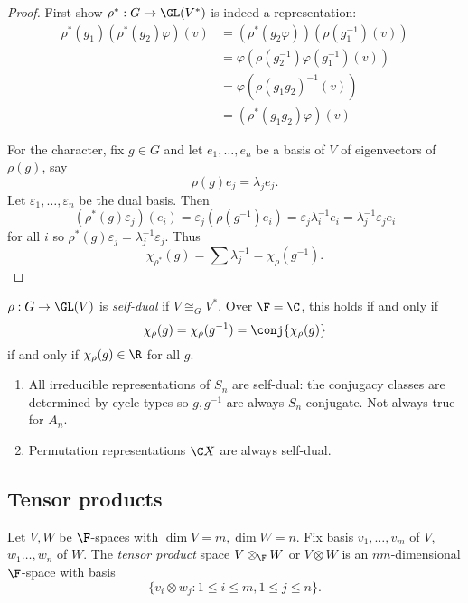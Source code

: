 \documentclass[a4paper]{article}
\theoremstyle{definition}
\begin{document}
\begin{proof}
  First show \(\rho^*: G \to \GL(V^*)\) is indeed a representation:
  \begin{align*}
    \rho^*(g_1) (\rho^*(g_2) \varphi)(v)
    &= (\rho^*(g_2\varphi)) (\rho(g_1^{-1}) (v)) \\
    &= \varphi(\rho(g_2^{-1}) \varphi(g_1^{-1})(v)) \\
    &= \varphi(\rho(g_1g_2)^{-1} (v)) \\
    &= (\rho^*(g_1g_2) \varphi)(v)
  \end{align*}

  For the character, fix \(g \in G\) and let \(e_1, \dots, e_n\) be a basis of \(V\) of eigenvectors of \(\rho(g)\), say
  \[
    \rho(g) e_j = \lambda_j e_j.
  \]
  Let \(\varepsilon_1, \dots, \varepsilon_n\) be the dual basis. Then
  \[
    (\rho^*(g) \varepsilon_j)(e_i)
    = \varepsilon_j (\rho(g^{-1}) e_i)
    = \varepsilon_j \lambda_i^{-1} e_i
    = \lambda_j^{-1} \varepsilon_j e_i
  \]
  for all \(i\) so \(\rho^*(g) \varepsilon_j = \lambda_j^{-1} \varepsilon_j\). Thus
  \[
    \chi_{\rho^*}(g) = \sum \lambda_j^{-1} = \chi_\rho (g^{-1}).
  \]
\end{proof}

\begin{definition}
  \(\rho: G \to \GL(V)\) is \emph{self-dual} if \(V \cong_G V^*\). Over \(\F = \C\), this holds if and only if
  \[
    \chi_\rho(g) = \chi_\rho(g^{-1}) = \conj{\chi_\rho(g)}
  \]
  if and only if \(\chi_\rho(g) \in \R\) for all \(g\).
\end{definition}

\begin{eg}\leavevmode
  \begin{enumerate}
  \item All irreducible representations of \(S_n\) are self-dual: the conjugacy classes are determined by cycle types so \(g, g^{-1}\) are always \(S_n\)-conjugate. Not always true for \(A_n\).
  \item Permutation representations \(\C X\) are always self-dual.
  \end{enumerate}
\end{eg}

\subsection{Tensor products}

\begin{definition}
  Let \(V, W\) be \(\F\)-spaces with \(\dim V = m, \dim W = n\). Fix basis \(v_1, \dots, v_m\) of \(V\), \(w_1 \dots, w_n\) of \(W\). The \emph{tensor product} space \(V \otimes_\F W\) or \(V \otimes W\) is an \(nm\)-dimensional \(\F\)-space with basis
  \[
    \{v_i \otimes w_j: 1 \leq i \leq m, 1 \leq j \leq n \}.
  \]
\end{definition}
\end{document}
